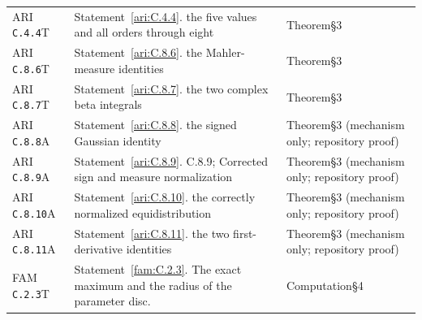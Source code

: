 \documentclass[11pt,a4paper]{article}
\theoremstyle{plain}
\theoremstyle{definition}
\begin{document}
\begin{longtable}{@{}L{.18\linewidth}L{.48\linewidth}L{.29\linewidth}@{}}
ARI \nolinkurl{C.4.4}\newline T & Statement~\ref{ari:C.4.4}. the five values and all orders through eight\newline {} & Theorem\newline §3\\
ARI \nolinkurl{C.8.6}\newline T & Statement~\ref{ari:C.8.6}. the Mahler-measure identities\newline {} & Theorem\newline §3\\
ARI \nolinkurl{C.8.7}\newline T & Statement~\ref{ari:C.8.7}. the two complex beta integrals\newline {} & Theorem\newline §3\\
ARI \nolinkurl{C.8.8}\newline A & Statement~\ref{ari:C.8.8}. the signed Gaussian identity\newline {} & Theorem\newline §3 (mechanism only; repository proof)\\
ARI \nolinkurl{C.8.9}\newline A & Statement~\ref{ari:C.8.9}. C.8.9; Corrected sign and measure normalization\newline {} & Theorem\newline §3 (mechanism only; repository proof)\\
ARI \nolinkurl{C.8.10}\newline A & Statement~\ref{ari:C.8.10}. the correctly normalized equidistribution\newline {} & Theorem\newline §3 (mechanism only; repository proof)\\
ARI \nolinkurl{C.8.11}\newline A & Statement~\ref{ari:C.8.11}. the two first-derivative identities\newline {} & Theorem\newline §3 (mechanism only; repository proof)\\
FAM \nolinkurl{C.2.3}\newline T & Statement~\ref{fam:C.2.3}. The exact maximum and the radius of the parameter disc.\newline {} & Computation\newline §4\\

\end{longtable}
\end{document}
